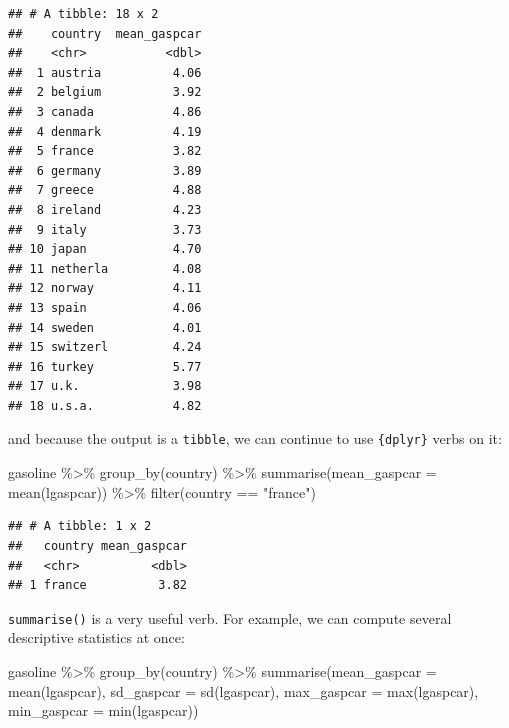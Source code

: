 \documentclass[
]{article}
\newenvironment{Shaded}{\begin{snugshade}}{\end{snugshade}}
\newcommand{\AttributeTok}[1]{\textcolor[rgb]{0.77,0.63,0.00}{#1}}
\newcommand{\FunctionTok}[1]{\textcolor[rgb]{0.00,0.00,0.00}{#1}}
\newcommand{\NormalTok}[1]{#1}
\newcommand{\SpecialCharTok}[1]{\textcolor[rgb]{0.00,0.00,0.00}{#1}}
\newcommand{\StringTok}[1]{\textcolor[rgb]{0.31,0.60,0.02}{#1}}
\begin{document}
\begin{verbatim}
## # A tibble: 18 x 2
##    country  mean_gaspcar
##    <chr>           <dbl>
##  1 austria          4.06
##  2 belgium          3.92
##  3 canada           4.86
##  4 denmark          4.19
##  5 france           3.82
##  6 germany          3.89
##  7 greece           4.88
##  8 ireland          4.23
##  9 italy            3.73
## 10 japan            4.70
## 11 netherla         4.08
## 12 norway           4.11
## 13 spain            4.06
## 14 sweden           4.01
## 15 switzerl         4.24
## 16 turkey           5.77
## 17 u.k.             3.98
## 18 u.s.a.           4.82
\end{verbatim}

and because the output is a \texttt{tibble}, we can continue to use \texttt{\{dplyr\}} verbs on it:

\begin{Shaded}
\begin{Highlighting}[]
\NormalTok{gasoline }\SpecialCharTok{\%\textgreater{}\%}
  \FunctionTok{group\_by}\NormalTok{(country) }\SpecialCharTok{\%\textgreater{}\%}
  \FunctionTok{summarise}\NormalTok{(}\AttributeTok{mean\_gaspcar =} \FunctionTok{mean}\NormalTok{(lgaspcar)) }\SpecialCharTok{\%\textgreater{}\%}
  \FunctionTok{filter}\NormalTok{(country }\SpecialCharTok{==} \StringTok{"france"}\NormalTok{)}
\end{Highlighting}
\end{Shaded}

\begin{verbatim}
## # A tibble: 1 x 2
##   country mean_gaspcar
##   <chr>          <dbl>
## 1 france          3.82
\end{verbatim}

\texttt{summarise()} is a very useful verb. For example, we can compute several descriptive statistics at once:

\begin{Shaded}
\begin{Highlighting}[]
\NormalTok{gasoline }\SpecialCharTok{\%\textgreater{}\%}
  \FunctionTok{group\_by}\NormalTok{(country) }\SpecialCharTok{\%\textgreater{}\%}
  \FunctionTok{summarise}\NormalTok{(}\AttributeTok{mean\_gaspcar =} \FunctionTok{mean}\NormalTok{(lgaspcar),}
            \AttributeTok{sd\_gaspcar =} \FunctionTok{sd}\NormalTok{(lgaspcar),}
            \AttributeTok{max\_gaspcar =} \FunctionTok{max}\NormalTok{(lgaspcar),}
            \AttributeTok{min\_gaspcar =} \FunctionTok{min}\NormalTok{(lgaspcar))}
\end{Highlighting}
\end{Shaded}
\end{document}
